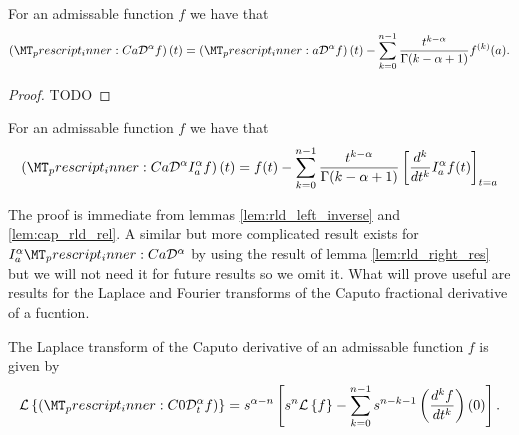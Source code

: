 \begin{mdframed}[innertopmargin=10pt]
\begin{lemma}
    \label{lem:cap_rld_rel}
    For an admissable function $ f $ we have that
    \begin{align}
        \left(\prescript{C}{a}{\mathcal{D}}^\alpha f\right)(t) = \left( \prescript{}{a}{\mathcal{D}}^\alpha f \right)(t) - \sum_{k=0}^{n-1} \frac{t^{k-\alpha}}{\Gamma(k - \alpha + 1)}f^{(k)}(a).
    \end{align}
\end{lemma}
\end{mdframed}
\begin{proof}
    TODO
\end{proof}
\begin{mdframed}[innertopmargin=10pt]
\begin{lemma}
    For an admissable function $ f $ we have that
    \begin{align}
        \left(\prescript{C}{a}{\mathcal{D}}^\alpha I_a^\alpha f\right)(t) = f(t) - \sum_{k=0}^{n-1} \frac{t^{k-\alpha}}{\Gamma(k-\alpha+1)} \left[\frac{d^k}{dt^k}I_a^\alpha f(t) \right]_{t=a}
    \end{align}
\end{lemma}
\end{mdframed}
The proof is immediate from lemmas \ref{lem:rld_left_inverse} and \ref{lem:cap_rld_rel}.
A similar but more complicated result exists for $  I_a^\alpha \prescript{C}{a}{\mathcal{D}}^\alpha $ by using the result of lemma \ref{lem:rld_right_res} but we will not need it for future results so we omit it. What will prove useful are results for the Laplace and Fourier transforms of the Caputo fractional derivative of a fucntion.
\begin{mdframed}[innertopmargin=10pt]
\begin{lemma}
\label{lem:cap_laplace}
    The Laplace transform of the Caputo derivative of an admissable function $ f $ is given by
    \begin{align}
        \laplace{\capder{0}{t}{\alpha}{f}} = s^{\alpha - n} \left[ s^n \laplace{f} - \sum_{k=0}^{n-1} s^{n-k-1} \left( \der{f}{t}{k} \right)(0) \right].
    \end{align}
\end{lemma}
\end{mdframed}
